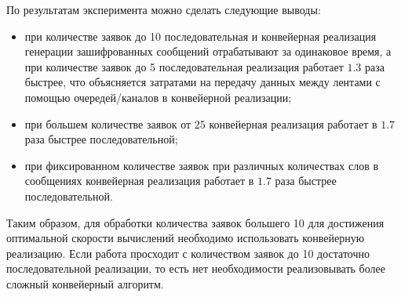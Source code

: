 По результатам эксперимента можно сделать следующие выводы:
\begin{itemize}[left=\parindent]
    \item при количестве заявок до 10 последовательная и конвейерная
         реализация генерации зашифрованных сообщений отрабатывают за
         одинаковое время, а при количестве заявок до 5 последовательная
         реализация работает $1.3$ раза быстрее, что объясняется затратами
         на передачу данных между лентами с помощью очередей/каналов
         в конвейерной реализации;
    \item при большем количестве заявок от 25 конвейерная реализация работает в
        $1.7$ раза быстрее последовательной;
    \item при фиксированном количестве заявок при различных количествах слов в
        сообщениях конвейерная реализация работает в $1.7$ раза быстрее
        последовательной.
\end{itemize}

Таким образом, для обработки количества заявок большего 10 для достижения
оптимальной скорости вычислений необходимо использовать конвейерную реализацию.
Если работа просходит с количеством заявок до 10 достаточно последовательной
реализации, то есть нет необходимости реализовывать более сложный конвейерный
алгоритм.
